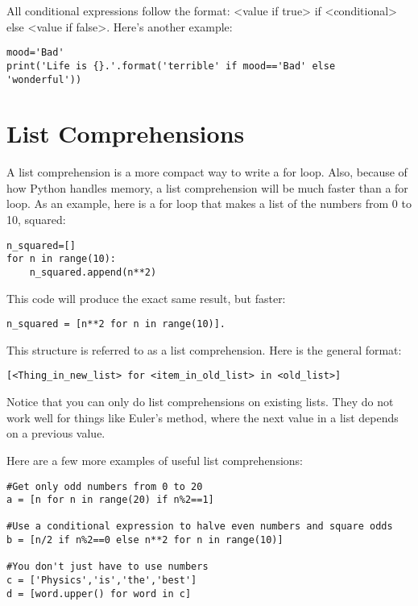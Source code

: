 All conditional expressions follow the format: <value if true> if <conditional> else <value if false>.  Here's another example:
\begin{Verbatim}
mood='Bad'
print('Life is {}.'.format('terrible' if mood=='Bad' else 'wonderful'))
\end{Verbatim}


\section{List Comprehensions}\label{sec:comprehensions}
A list comprehension is a more compact way to write a for loop.  Also, because of how Python handles memory, a list comprehension will be much faster than a for loop.  As an example, here is a for loop that makes a list of the numbers from 0 to 10, squared:
\begin{Verbatim}
n_squared=[]
for n in range(10):
    n_squared.append(n**2)

\end{Verbatim}
This code will produce the exact same result, but faster:
\begin{Verbatim}
n_squared = [n**2 for n in range(10)].
\end{Verbatim}
This structure is referred to as a list comprehension. Here is the general format:
\begin{Verbatim}
[<Thing_in_new_list> for <item_in_old_list> in <old_list>]
\end{Verbatim}
Notice that you can only do list comprehensions on existing lists.  They do not work well for things like Euler's method, where the next value in a list depends on a previous value.

Here are a few more examples of useful list comprehensions:
\begin{Verbatim}
#Get only odd numbers from 0 to 20
a = [n for n in range(20) if n%2==1]

#Use a conditional expression to halve even numbers and square odds
b = [n/2 if n%2==0 else n**2 for n in range(10)]

#You don't just have to use numbers
c = ['Physics','is','the','best']
d = [word.upper() for word in c]
\end{Verbatim}

